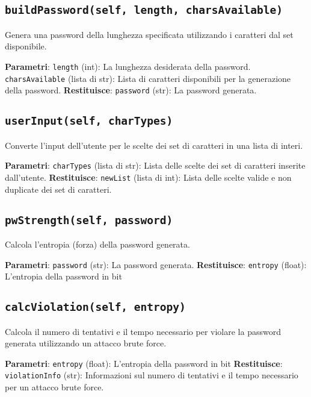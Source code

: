 \documentclass{article}
\begin{document}
        \subsection*{\texttt{buildPassword(self, length, charsAvailable)}}
            Genera una password della lunghezza specificata utilizzando i caratteri dal set disponibile.
            \begin{outline}
                \1 \textbf{Parametri}:
                    \2 \texttt{length} (int): La lunghezza desiderata della password.
                    \2 \texttt{charsAvailable} (lista di str): Lista di caratteri disponibili per la generazione della password.
                \1 \textbf{Restituisce}:
                    \2 \texttt{password} (str): La password generata.
            \end{outline}

        \subsection*{\texttt{userInput(self, charTypes)}}
            Converte l'input dell'utente per le scelte dei set di caratteri in una lista di interi.
            \begin{outline}
                \1 \textbf{Parametri}:
                    \2 \texttt{charTypes} (lista di str): Lista delle scelte dei set di caratteri inserite dall'utente.
                \1 \textbf{Restituisce}:
                    \2 \texttt{newList} (lista di int): Lista delle scelte valide e non duplicate dei set di caratteri.
            \end{outline}

        \subsection*{\texttt{pwStrength(self, password)}}
            Calcola l'entropia (forza) della password generata.
            \begin{outline}
                \1 \textbf{Parametri}:
                    \2 \texttt{password} (str): La password generata.
                \1 \textbf{Restituisce}:
                    \2 \texttt{entropy} (float): L'entropia della password in bit
            \end{outline}

        \subsection*{\texttt{calcViolation(self, entropy)}}
            Calcola il numero di tentativi e il tempo necessario per violare la password generata utilizzando un attacco brute force.
            \begin{outline}
                \1 \textbf{Parametri}:
                    \2 \texttt{entropy} (float): L'entropia della password in bit
                \1 \textbf{Restituisce}:
                    \2 \texttt{violationInfo} (str): Informazioni sul numero di tentativi e il tempo necessario per un attacco brute force.
            \end{outline}
    
\end{document}
